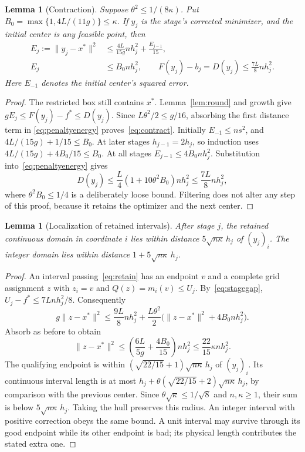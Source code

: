 \documentclass[11pt]{article}
\newtheorem{lemma}[theorem]{Lemma}
\theoremstyle{remark}
\newcommand{\norm}[1]{\lVert#1\rVert}
\newcommand{\OPT}{f^*}
\begin{document}
\begin{lemma}[Contraction]\label{lem:contraction}
Suppose $\theta^2\le1/(8\kappa)$. Put
$B_0=\max\{1,4L/(11g)\}\le\kappa$. If $y_j$ is the stage's corrected
minimizer, and the initial center is any feasible point, then
\begin{align}
E_j:=\norm{y_j-x^*}^2
&\le\frac{4L}{15g}nh_j^2+\frac{E_{j-1}}{15},\label{eq:contract}\\
E_j&\le B_0nh_j^2,\qquad
F(y_j)-b_j=D(y_j)\le\frac{7L}{8}nh_j^2.\label{eq:stagegap}
\end{align}
Here $E_{-1}$ denotes the initial center's squared error.
\end{lemma}
\begin{proof}
The restricted box still contains $x^*$. Lemma~\ref{lem:round} and
growth give $gE_j\le F(y_j)-\OPT\le D(y_j)$. Since
$L\theta^2/2\le g/16$, absorbing the first distance term in
\eqref{eq:penaltyenergy} proves~\eqref{eq:contract}.
Initially $E_{-1}\le ns^2$, and
$4L/(15g)+1/15\le B_0$. At later stages $h_{j-1}=2h_j$, so induction
uses $4L/(15g)+4B_0/15\le B_0$. At all stages
$E_{j-1}\le4B_0nh_j^2$. Substitution into~\eqref{eq:penaltyenergy}
gives
\[
D(y_j)\le\frac L4(1+10\theta^2 B_0)nh_j^2
\le\frac{7L}{8}nh_j^2,
\]
where $\theta^2B_0\le1/4$ is a deliberately loose bound. Filtering
does not alter any step of this proof, because it retains the optimizer
and the next center.
\end{proof}

\begin{lemma}[Localization of retained intervals]\label{lem:localize}
After stage $j$, the retained continuous domain in coordinate $i$ lies
within distance $5\sqrt{n\kappa}\,h_j$ of $(y_j)_i$. The integer domain
lies within distance $1+5\sqrt{n\kappa}\,h_j$.
\end{lemma}
\begin{proof}
An interval passing~\eqref{eq:retain} has an endpoint $v$ and a complete
grid assignment $z$ with $z_i=v$ and $Q(z)=m_i(v)\le U_j$.
By~\eqref{eq:stagegap}, $U_j-\OPT\le7Lnh_j^2/8$. Consequently
\[
g\norm{z-x^*}^2
\le\frac{9L}{8}nh_j^2+
\frac{L\theta^2}{2}\bigl(\norm{z-x^*}^2+4B_0nh_j^2\bigr).
\]
Absorb as before to obtain
\begin{equation}\label{eq:witnessradius}
\norm{z-x^*}^2\le
\left(\frac{6L}{5g}+\frac{4B_0}{15}\right)nh_j^2
\le\frac{22}{15}\kappa nh_j^2.
\end{equation}
The qualifying endpoint is within
$(\sqrt{22/15}+1)\sqrt{n\kappa}\,h_j$ of $(y_j)_i$.
Its continuous interval length is at most
$h_j+\theta(\sqrt{22/15}+2)\sqrt{n\kappa}\,h_j$, by comparison
with the previous center. Since $\theta\sqrt\kappa\le1/\sqrt8$
and $n,\kappa\ge1$, their sum is below
$5\sqrt{n\kappa}\,h_j$. Taking the hull preserves this radius.
An integer interval with positive correction obeys the same bound.
A unit interval may survive through its good endpoint while its other
endpoint is bad; its physical length contributes the stated extra one.
\end{proof}
\end{document}
